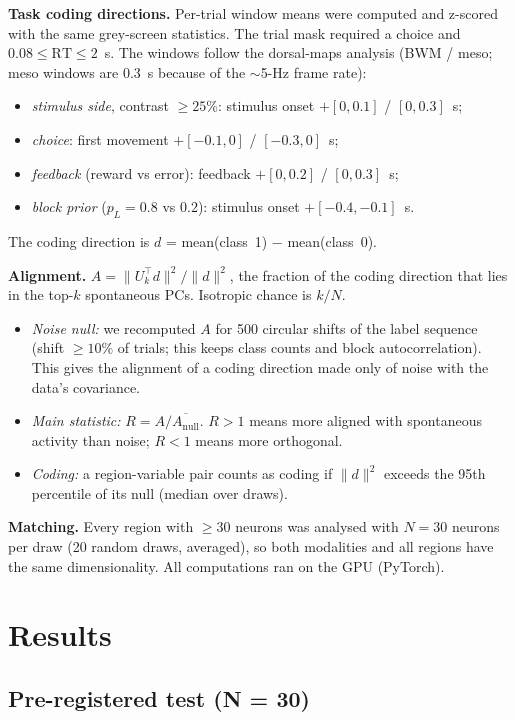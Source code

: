 \documentclass[10pt]{article}
\begin{document}
\textbf{Task coding directions.} Per-trial window means were computed and z-scored with the same grey-screen statistics. The trial mask required a choice and $0.08\le\mathrm{RT}\le2$~s. The windows follow the dorsal-maps analysis (BWM / meso; meso windows are 0.3~s because of the $\sim$5-Hz frame rate):
\begin{itemize}
  \item \emph{stimulus side}, contrast $\ge 25\%$: stimulus onset $+[0, 0.1]$ / $[0, 0.3]$~s;
  \item \emph{choice}: first movement $+[-0.1, 0]$ / $[-0.3, 0]$~s;
  \item \emph{feedback} (reward vs error): feedback $+[0, 0.2]$ / $[0, 0.3]$~s;
  \item \emph{block prior} ($p_L = 0.8$ vs $0.2$): stimulus onset $+[-0.4, -0.1]$~s.
\end{itemize}
The coding direction is $d$ = mean(class~1) $-$ mean(class~0).

\textbf{Alignment.} $A = \|U_k^\top d\|^2/\|d\|^2$, the fraction of the coding direction that lies in the top-$k$ spontaneous PCs. Isotropic chance is $k/N$.
\begin{itemize}
  \item \emph{Noise null:} we recomputed $A$ for 500 circular shifts of the label sequence (shift $\ge 10\%$ of trials; this keeps class counts and block autocorrelation). This gives the alignment of a coding direction made only of noise with the data's covariance.
  \item \emph{Main statistic:} $R = A/\overline{A_\text{null}}$. $R>1$ means more aligned with spontaneous activity than noise; $R<1$ means more orthogonal.
  \item \emph{Coding:} a region-variable pair counts as coding if $\|d\|^2$ exceeds the 95th percentile of its null (median over draws).
\end{itemize}

\textbf{Matching.} Every region with $\ge 30$ neurons was analysed with $N = 30$ neurons per draw (20 random draws, averaged), so both modalities and all regions have the same dimensionality. All computations ran on the GPU (PyTorch).

\section{Results}

\subsection{Pre-registered test (N = 30)}
\end{document}
